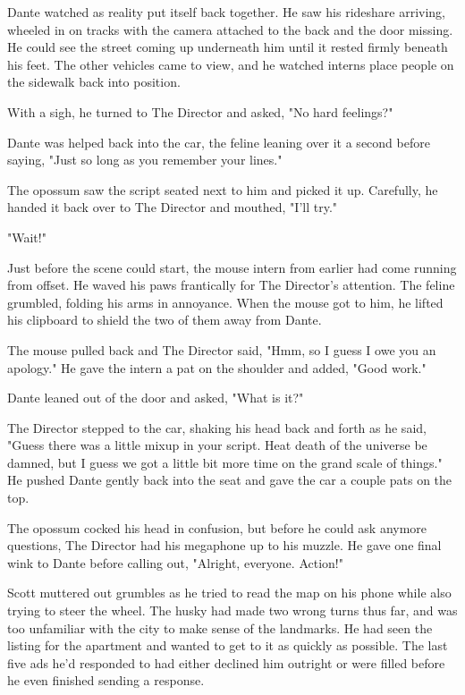Dante watched as reality put itself back together. He saw his rideshare arriving, wheeled in on tracks with the camera attached to the back and the door missing. He could see the street coming up underneath him until it rested firmly beneath his feet. The other vehicles came to view, and he watched interns place people on the sidewalk back into position.

With a sigh, he turned to The Director and asked, "No hard feelings?"

Dante was helped back into the car, the feline leaning over it a second before saying, "Just so long as you remember your lines."

The opossum saw the script seated next to him and picked it up. Carefully, he handed it back over to The Director and mouthed, "I'll try."

"Wait!"

Just before the scene could start, the mouse intern from earlier had come running from offset. He waved his paws frantically for The Director's attention. The feline grumbled, folding his arms in annoyance. When the mouse got to him, he lifted his clipboard to shield the two of them away from Dante.

The mouse pulled back and The Director said, "Hmm, so I guess I owe you an apology." He gave the intern a pat on the shoulder and added, "Good work."

Dante leaned out of the door and asked, "What is it?"

The Director stepped to the car, shaking his head back and forth as he said, "Guess there was a little mixup in your script. Heat death of the universe be damned, but I guess we got a little bit more time on the grand scale of things." He pushed Dante gently back into the seat and gave the car a couple pats on the top.

The opossum cocked his head in confusion, but before he could ask anymore questions, The Director had his megaphone up to his muzzle. He gave one final wink to Dante before calling out, "Alright, everyone. Action!"

\secdiv

Scott muttered out grumbles as he tried to read the map on his phone while also trying to steer the wheel. The husky had made two wrong turns thus far, and was too unfamiliar with the city to make sense of the landmarks. He had seen the listing for the apartment and wanted to get to it as quickly as possible. The last five ads he'd responded to had either declined him outright or were filled before he even finished sending a response.

